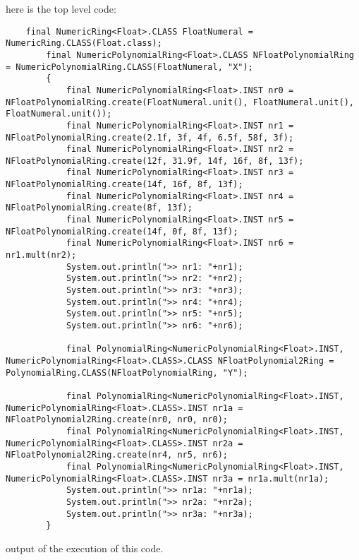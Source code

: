 \documentclass[8pt]{article}
\begin{document}
here is the top level code:
\begin{lstlisting}
	final NumericRing<Float>.CLASS FloatNumeral = NumericRing.CLASS(Float.class);
        final NumericPolynomialRing<Float>.CLASS NFloatPolynomialRing = NumericPolynomialRing.CLASS(FloatNumeral, "X");
        {
            final NumericPolynomialRing<Float>.INST nr0 = NFloatPolynomialRing.create(FloatNumeral.unit(), FloatNumeral.unit(), FloatNumeral.unit());
            final NumericPolynomialRing<Float>.INST nr1 = NFloatPolynomialRing.create(2.1f, 3f, 4f, 6.5f, 58f, 3f);
            final NumericPolynomialRing<Float>.INST nr2 = NFloatPolynomialRing.create(12f, 31.9f, 14f, 16f, 8f, 13f);
            final NumericPolynomialRing<Float>.INST nr3 = NFloatPolynomialRing.create(14f, 16f, 8f, 13f);
            final NumericPolynomialRing<Float>.INST nr4 = NFloatPolynomialRing.create(8f, 13f);
            final NumericPolynomialRing<Float>.INST nr5 = NFloatPolynomialRing.create(14f, 0f, 8f, 13f);
            final NumericPolynomialRing<Float>.INST nr6 = nr1.mult(nr2);
            System.out.println(">> nr1: "+nr1);
            System.out.println(">> nr2: "+nr2);
            System.out.println(">> nr3: "+nr3);
            System.out.println(">> nr4: "+nr4);
            System.out.println(">> nr5: "+nr5);
            System.out.println(">> nr6: "+nr6);

            final PolynomialRing<NumericPolynomialRing<Float>.INST, NumericPolynomialRing<Float>.CLASS>.CLASS NFloatPolynomial2Ring = PolynomialRing.CLASS(NFloatPolynomialRing, "Y");

            final PolynomialRing<NumericPolynomialRing<Float>.INST, NumericPolynomialRing<Float>.CLASS>.INST nr1a = NFloatPolynomial2Ring.create(nr0, nr0, nr0);
            final PolynomialRing<NumericPolynomialRing<Float>.INST, NumericPolynomialRing<Float>.CLASS>.INST nr2a = NFloatPolynomial2Ring.create(nr4, nr5, nr6);
            final PolynomialRing<NumericPolynomialRing<Float>.INST, NumericPolynomialRing<Float>.CLASS>.INST nr3a = nr1a.mult(nr1a);
            System.out.println(">> nr1a: "+nr1a);
            System.out.println(">> nr2a: "+nr2a);
            System.out.println(">> nr3a: "+nr3a);
        }
\end{lstlisting}

output of the execution of this code.
\end{document}
